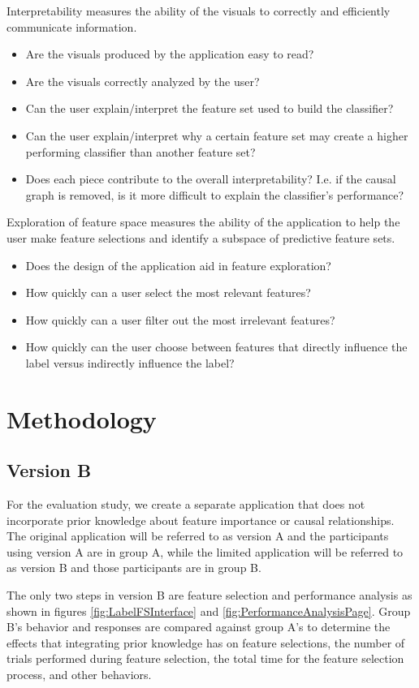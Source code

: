 Interpretability measures the ability of the visuals to correctly and efficiently communicate information.
\begin{itemize}
\item{Are the visuals produced by the application easy to read?}
\item{Are the visuals correctly analyzed by the user?}
\item{Can the user explain/interpret the feature set used to build the classifier? }
\item{Can the user explain/interpret why a certain feature set may create a higher performing classifier than another feature set?}
\item{Does each piece contribute to the overall interpretability? I.e. if the causal graph is removed, is it more difficult to explain the classifier’s performance?}
\end{itemize}

Exploration of feature space measures the ability of the application to help the user make feature selections and identify a subspace of predictive feature sets.
\begin{itemize}
\item{Does the design of the application aid in feature exploration?}
\item{How quickly can a user select the most relevant features?}
\item{How quickly can a user filter out the most irrelevant features?}
\item{How quickly can the user choose between features that directly influence the label versus indirectly influence the label?}
\end{itemize}

\section { Methodology }
\subsection { Version B }
For the evaluation study, we create a separate application that does not incorporate prior knowledge about feature importance or causal relationships. The original application will be referred to as version A and the participants using version A are in group A, while the limited application will be referred to as version B and those participants are in group B.

The only two steps in version B are feature selection and performance analysis as shown in figures \ref{fig:LabelFSInterface} and \ref{fig:PerformanceAnalysisPage}. Group B's behavior and responses are compared against group A's to determine the effects that integrating prior knowledge has on feature selections, the number of trials performed during feature selection, the total time for the feature selection process, and other behaviors.

